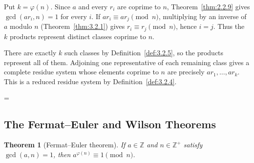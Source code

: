 \documentclass[11pt]{article}
\makeatletter
\theoremstyle{ntstyle}
\newtheorem{theorem}{Theorem}[subsection]
\let\nt@closedisplay\]
\def\nt@guardedclose{\@ifnextchar\par{\nt@closeafterpar}{\@ifnextchar\end{\postdisplaypenalty\@M\nt@closedisplay}{\nt@closedisplay}}}
\def\nt@closeafterpar\par{\@ifnextchar\par{\nt@closeafterpar}{\@ifnextchar\end{\postdisplaypenalty\@M\nt@closedisplay\par}{\nt@closedisplay\par}}}
\renewenvironment{proof}[1][\proofname]{\par
  \pushQED{\qed}\normalfont\topsep\medskipamount\edef\nt@afterproof{\@endparpenalty=\the\@endparpenalty\relax}\@beginparpenalty\@M\@endparpenalty\@M\let\]\nt@guardedclose\trivlist\item[]\textit{#1\@addpunct{.}} \ignorespaces}{\ifvmode\addpenalty\@M\fi\popQED\nt@afterproof\endtrivlist\@endpefalse}
\makeatother
\begin{document}
\begin{proof}
Put $k=\varphi(n)$. Since $a$ and every $r_i$ are coprime to $n$,
    Theorem~\ref{thm:2.2.9} gives $\gcd(ar_i,n)=1$ for every $i$.
    If $ar_i\equiv ar_j\pmod n$, multiplying by an inverse of $a$ modulo $n$
    (Theorem~\ref{thm:3.2.1}) gives $r_i\equiv r_j\pmod n$, hence $i=j$. Thus the $k$ products represent
    distinct classes coprime to $n$.

    There are exactly $k$ such classes by Definition~\ref{def:3.2.5}, so
    the products represent all of them. Adjoining one representative
    of each remaining class gives a complete residue system whose
    elements coprime to $n$ are precisely $ar_1,\ldots,ar_k$.
    This is a reduced residue system by Definition~\ref{def:3.2.4}.

\end{proof}
\subsection{The Fermat--Euler and Wilson Theorems}

\begin{theorem}[Fermat--Euler theorem]\label{thm:3.3.1} If $a \in \mathbb{Z}$
	and $n \in \mathbb{Z}^+$ satisfy $\gcd(a, n)=1$, then $a^{\varphi(n)} \equiv
		1 \pmod{n}$.

\end{theorem}
\end{document}

